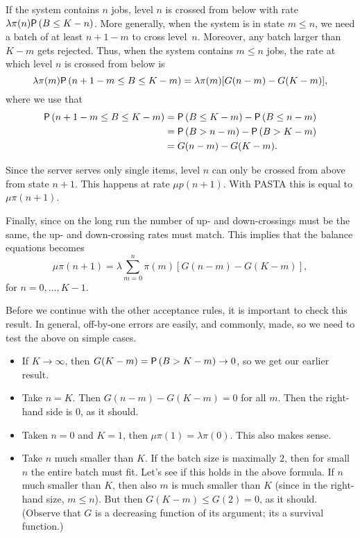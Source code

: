 \begin{exercise}[\faPhoto]
\begin{solution}
  If the system contains $n$ jobs,  level $n$ is
  crossed from below with rate $\lambda \pi(n) \P{B \leq K-n}$.  More generally,
  when the system is in state $m\leq n$, we need a batch of at least
  $n+1-m$ to cross level~$n$. Moreover, any batch larger than $K-m$
  gets rejected. Thus, when the system contains $m \leq n $ jobs, the
  rate at which level $n$ is crossed from below is
  \begin{equation*}
  \lambda \pi(m) \P{n+1-m\leq B \leq K-m}  = \lambda \pi(m)
  [G(n-m)-G(K-m)],
  \end{equation*}
where we use that
\begin{align*}
\P{n+1-m\leq B \leq K-m} 
&= \P{B \leq K-m} - \P{B \leq n-m}  \\
&= \P{B > n-m} - \P{B > K-m} \\
&= G(n-m)-G(K-m).
\end{align*}

  Since the server serves only single items, level $n$ can only be
  crossed from above from state $n+1$. This happens at rate $\mu p(n+1)$. With PASTA this is equal to $\mu \pi(n+1)$.

  Finally, since on the long run the number of up- and down-crossings must
  be the same, the up- and down-crossing rates must match. This implies
  that the balance equations becomes
  \begin{equation*}
    \mu \pi(n+1) = \lambda \sum_{m=0}^n \pi(m)   [G(n-m)-G(K-m)],
  \end{equation*}
  for $n=0,\ldots, K-1$. 

  Before we continue with the other acceptance rules, it is important
  to check this result.  In general, off-by-one errors are easily, and
  commonly, made, so we need to test the above on simple cases. 
  \begin{itemize}
  \item  If $K\to \infty$, then $G(K-m)=\P{B>K-m}\to 0$, so we get our earlier result. 
  \item Take $n=K$. Then $G(n-m)-G(K-m)=0$ for all $m$. Then the right-hand side is 0, as it should.
  \item Taken $n=0$ and $K=1$, then $\mu \pi(1)= \lambda \pi(0)$. This also makes sense. 
  \item Take $n$ much smaller than $K$. If the batch size is maximally
    $2$, then for small $n$ the entire batch must fit. Let's see if
    this holds in the above formula. If $n$ much smaller than $K$,
    then also $m$ is much smaller than $K$ (since in the right-hand
    size, $m\leq n$). But then $G(K-m) \leq G(2) = 0$, as it
    should. (Observe that $G$ is a decreasing function of its argument;
    its a survival function.)
  \end{itemize}


\end{solution}
\end{exercise}
